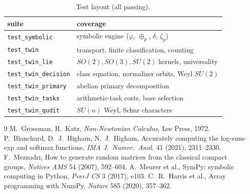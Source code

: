 \documentclass[11pt,a4paper]{article}
\newcommand{\code}[1]{\texttt{#1}}
\theoremstyle{definition}
\begin{document}
\begin{table}[ht]
\centering
\caption{Test layout (all passing).}
\label{tab:tests}
\begin{tabular}{ll}
\toprule
suite & coverage \\
\midrule
\code{test\_symbolic} & symbolic engine ($\varphi$, $\oplus_p$, $\delta$, $\zeta_p$) \\
\code{test\_twin} & transport, finite classification, counting \\
\code{test\_twin\_lie} & $SO(2),SO(3),SU(2)$ kernels, universality \\
\code{test\_twin\_decision} & class equation, normalizer orbits, Weyl $SU(2)$ \\
\code{test\_twin\_primary} & abelian primary decomposition \\
\code{test\_twin\_tasks} & arithmetic-task costs, base selection \\
\code{test\_twin\_qudit} & $SU(n)$ Weyl, Schur characters \\
\bottomrule
\end{tabular}
\end{table}

\begin{thebibliography}{9}
 M.~Grossman, R.~Katz, \emph{Non-Newtonian Calculus},
Lee Press, 1972.
 P.~Blanchard, D.~J.~Higham, N.~J.~Higham, Accurately
computing the log-sum-exp and softmax functions, \emph{IMA J.\ Numer.\ Anal.}
41 (2021), 2311--2330.
 F.~Mezzadri, How to generate random matrices from the
classical compact groups, \emph{Notices AMS} 54 (2007), 592--604.
 A.~Meurer et al., SymPy: symbolic computing in Python,
\emph{PeerJ CS} 3 (2017), e103.
 C.~R.~Harris et al., Array programming with NumPy,
\emph{Nature} 585 (2020), 357--362.
\end{thebibliography}
\end{document}
